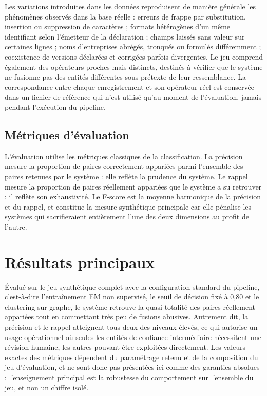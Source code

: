 Les variations introduites dans les données reproduisent de manière générale les phénomènes observés dans la base réelle : erreurs de frappe par substitution, insertion ou suppression de caractères ; formats hétérogènes d'un même identifiant selon l'émetteur de la déclaration ; champs laissés sans valeur sur certaines lignes ; noms d'entreprises abrégés, tronqués ou formulés différemment ; coexistence de versions déclarées et corrigées parfois divergentes. Le jeu comprend également des opérateurs proches mais distincts, destinés à vérifier que le système ne fusionne pas des entités différentes sous prétexte de leur ressemblance. La correspondance entre chaque enregistrement et son opérateur réel est conservée dans un fichier de référence qui n'est utilisé qu'au moment de l'évaluation, jamais pendant l'exécution du pipeline.

\subsection{Métriques d'évaluation}

L'évaluation utilise les métriques classiques de la classification. La précision mesure la proportion de paires correctement appariées parmi l'ensemble des paires retenues par le système : elle reflète la prudence du système. Le rappel mesure la proportion de paires réellement appariées que le système a su retrouver : il reflète son exhaustivité. Le F-score est la moyenne harmonique de la précision et du rappel, et constitue la mesure synthétique principale car elle pénalise les systèmes qui sacrifieraient entièrement l'une des deux dimensions au profit de l'autre.

\section{Résultats principaux}

Évalué sur le jeu synthétique complet avec la configuration standard du pipeline, c'est-à-dire l'entraînement EM non supervisé, le seuil de décision fixé à 0,80 et le clustering sur graphe, le système retrouve la quasi-totalité des paires réellement appariées tout en commettant très peu de fusions abusives. Autrement dit, la précision et le rappel atteignent tous deux des niveaux élevés, ce qui autorise un usage opérationnel où seules les entités de confiance intermédiaire nécessitent une révision humaine, les autres pouvant être exploitées directement. Les valeurs exactes des métriques dépendent du paramétrage retenu et de la composition du jeu d'évaluation, et ne sont donc pas présentées ici comme des garanties absolues : l'enseignement principal est la robustesse du comportement sur l'ensemble du jeu, et non un chiffre isolé.

